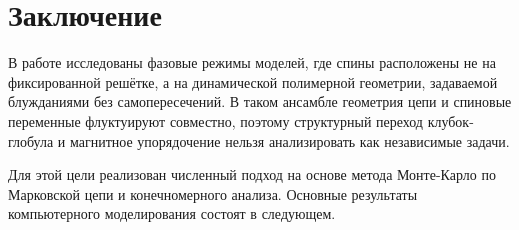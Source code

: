 \chapter*{Заключение}                       %


В работе исследованы фазовые режимы моделей, где спины расположены не на фиксированной решётке, а на динамической полимерной геометрии, задаваемой блужданиями без самопересечений. 
В таком ансамбле геометрия цепи и спиновые переменные флуктуируют совместно, поэтому структурный переход клубок-глобула и магнитное упорядочение нельзя анализировать как независимые задачи.

Для этой цели реализован численный подход на основе метода Монте-Карло по Марковской цепи и конечномерного анализа. 
Основные результаты компьютерного моделирования состоят в следующем.

